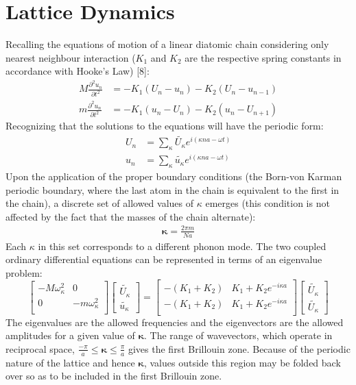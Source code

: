 \section{Lattice Dynamics}

Recalling the equations of motion of a linear diatomic chain considering only nearest neighbour interaction ($K_1$ and $K_2$ are the respective spring constants in accordance with Hooke's Law) [8]:
\begin{align}
	M\frac{\partial ^2 u_n}{\partial t^2}&=-K_1(U_n-u_n)-K_2(U_n-u_{n-1})\\
	m\frac{\partial ^2 u_n}{\partial t^2}&=-K_1(u_n-U_n)-K_2(u_n-U_{n+1})
\end{align}
Recognizing that the solutions to the equations will have the periodic form:
\begin{align*}
	U_n&=\sum_\kappa \tilde{U_\kappa}e^{i(\kappa na-\omega t)}\\
	u_n&=\sum_\kappa \tilde{u_\kappa}e^{i(\kappa na-\omega t)}
\end{align*}
Upon the application of the proper boundary conditions (the Born-von Karman periodic boundary, where the last atom in the chain is equivalent to the first in the chain), a discrete set of allowed values of $\kappa$ emerges (this condition is not affected by the fact that the masses of the chain alternate):
\begin{align*}
	\pmb{\kappa}=\frac{2\pi m}{Na}
\end{align*}
Each $\kappa$ in this set corresponds to a different phonon mode. The two coupled ordinary differential equations can be represented in terms of an eigenvalue problem:
\[
\begin{bmatrix}
  -M\omega_\kappa^2 & 0\\
  0 & -m\omega_\kappa^2\\ 
 \end{bmatrix}
\begin{bmatrix}
\tilde{U_\kappa} \\ 
\tilde{u_\kappa}
\end{bmatrix}
=
\begin{bmatrix}
  -(K_1+K_2) & K_1+K_2e^{-i\kappa a}\\
  -(K_1+K_2) & K_1+K_2e^{-i\kappa a}\\ 
 \end{bmatrix}
\begin{bmatrix}
\tilde{U_\kappa} \\ \tilde{U_\kappa}
\end{bmatrix}
\]
The eigenvalues are the allowed frequencies and the eigenvectors are the allowed amplitudes for a given value of $\pmb{\kappa}$. The range of wavevectors, which operate in reciprocal space,  $\frac{-\pi}{a}\leq \pmb{\kappa}\leq\frac{\pi}{a}$ gives the first Brillouin zone. Because of the periodic nature of the lattice and hence $\pmb{\kappa}$, values outside this region may be folded back over so as to be included in the first Brillouin zone.

